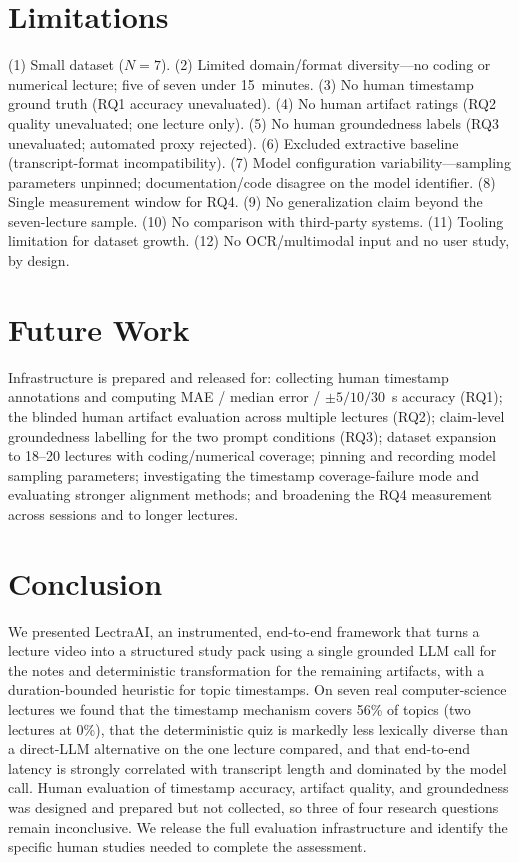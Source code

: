 \documentclass[conference]{IEEEtran}
\begin{document}
\section{Limitations}
(1) Small dataset ($N=7$). (2) Limited domain/format diversity---no coding or numerical lecture; five of seven under 15~minutes. (3) No human timestamp ground truth (RQ1 accuracy unevaluated). (4) No human artifact ratings (RQ2 quality unevaluated; one lecture only). (5) No human groundedness labels (RQ3 unevaluated; automated proxy rejected). (6) Excluded extractive baseline (transcript-format incompatibility). (7) Model configuration variability---sampling parameters unpinned; documentation/code disagree on the model identifier. (8) Single measurement window for RQ4. (9) No generalization claim beyond the seven-lecture sample. (10) No comparison with third-party systems. (11) Tooling limitation for dataset growth. (12) No OCR/multimodal input and no user study, by design.

\section{Future Work}
Infrastructure is prepared and released for: collecting human timestamp annotations and computing MAE / median error / $\pm5/10/30$~s accuracy (RQ1); the blinded human artifact evaluation across multiple lectures (RQ2); claim-level groundedness labelling for the two prompt conditions (RQ3); dataset expansion to 18--20 lectures with coding/numerical coverage; pinning and recording model sampling parameters; investigating the timestamp coverage-failure mode and evaluating stronger alignment methods; and broadening the RQ4 measurement across sessions and to longer lectures.

\section{Conclusion}
We presented LectraAI, an instrumented, end-to-end framework that turns a lecture video into a structured study pack using a single grounded LLM call for the notes and deterministic transformation for the remaining artifacts, with a duration-bounded heuristic for topic timestamps. On seven real computer-science lectures we found that the timestamp mechanism covers 56\% of topics (two lectures at 0\%), that the deterministic quiz is markedly less lexically diverse than a direct-LLM alternative on the one lecture compared, and that end-to-end latency is strongly correlated with transcript length and dominated by the model call. Human evaluation of timestamp accuracy, artifact quality, and groundedness was designed and prepared but not collected, so three of four research questions remain inconclusive. We release the full evaluation infrastructure and identify the specific human studies needed to complete the assessment.



\end{document}
